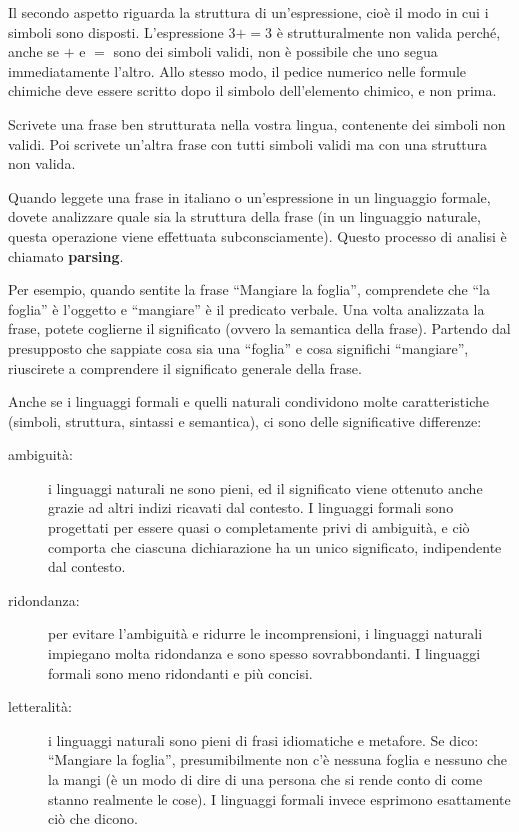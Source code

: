 \documentclass[10pt]{book}
\begin{document}
Il secondo aspetto riguarda la struttura di un'espressione, cioè il modo in cui i simboli sono disposti. L'espressione
$3 + = 3$ è strutturalmente non valida perché, anche se $+$ e $=$ sono dei simboli validi, non è possibile che uno segua immediatamente l'altro. Allo stesso modo, il pedice numerico nelle formule chimiche deve essere scritto dopo il simbolo dell'elemento chimico, e non prima.

\vspace{0.2in}
\begin{exercise}

Scrivete una frase ben strutturata nella vostra lingua, contenente dei simboli non validi. Poi scrivete un'altra frase con tutti simboli validi ma con una struttura non valida.

\end{exercise}

Quando leggete una frase in italiano o un'espressione in un linguaggio formale, dovete analizzare quale sia la struttura della frase (in un linguaggio naturale, questa operazione viene effettuata subconsciamente). Questo processo di analisi è chiamato {\bf parsing}.

Per esempio, quando sentite la frase ``Mangiare la foglia'', comprendete che ``la foglia'' è l'oggetto e ``mangiare'' è il predicato verbale.  Una volta   analizzata la frase, potete coglierne il significato (ovvero la semantica della frase). Partendo dal presupposto che sappiate cosa sia una ``foglia'' e cosa significhi ``mangiare'', riuscirete a comprendere il significato generale della frase.

Anche se i linguaggi formali e quelli naturali condividono molte    caratteristiche (simboli, struttura, sintassi e semantica), ci sono delle   significative differenze:

\begin{description}

\item[ambiguità:] i linguaggi naturali ne sono pieni, ed il significato viene   ottenuto anche grazie ad altri indizi ricavati dal contesto. I linguaggi formali sono progettati per essere quasi o completamente privi di ambiguità, e ciò comporta che ciascuna dichiarazione ha un unico significato, indipendente dal contesto.

\item[ridondanza:] per evitare l'ambiguità e ridurre le incomprensioni, i linguaggi naturali impiegano molta ridondanza e sono spesso sovrabbondanti. I linguaggi formali sono meno ridondanti e più concisi.

\item[letteralità:] i linguaggi naturali sono pieni di frasi idiomatiche e metafore. Se dico: ``Mangiare la foglia'', presumibilmente non c'è nessuna foglia e nessuno che la mangi (è un modo di dire di una persona che si rende conto di come stanno realmente le cose). I linguaggi formali invece esprimono esattamente ciò che dicono.

\end{description}
\end{document}
